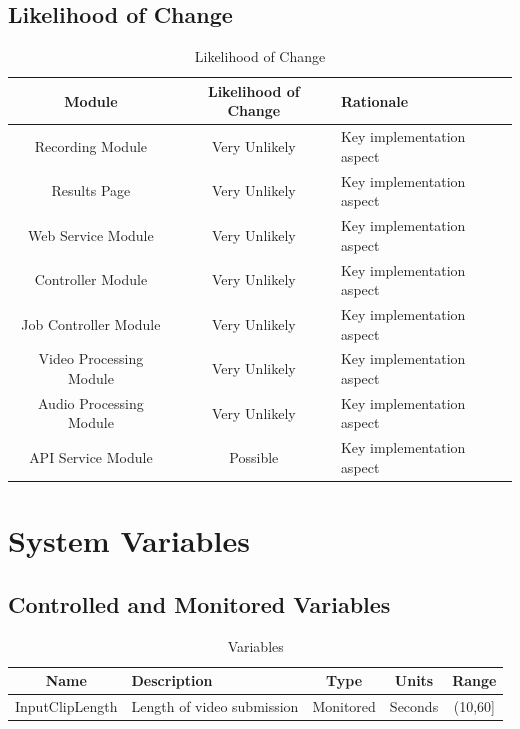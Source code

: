 \documentclass{article}
\begin{document}
\subsection{Likelihood of Change}
\begin{table}[H]
    \caption{Likelihood of Change}
    \centering
    \begin{tabularx}{\textwidth}{|c|c|X|} \hline
        \textbf{Module} & \textbf{Likelihood of Change} & \textbf{Rationale} \\ \hline
         Recording Module & Very Unlikely & Key implementation aspect \\ \hline
         Results Page & Very Unlikely & Key implementation aspect \\ \hline
         Web Service Module & Very Unlikely & Key implementation aspect \\ \hline
         Controller Module & Very Unlikely & Key implementation aspect \\ \hline
         Job Controller Module & Very Unlikely & Key implementation aspect \\ \hline
         Video Processing Module & Very Unlikely & Key implementation aspect \\ \hline
         Audio Processing Module & Very Unlikely & Key implementation aspect \\ \hline
         API Service Module & Possible & Key implementation aspect \\ \hline
    \end{tabularx}
    \label{tab:likelihood of change}
\end{table}

\section{System Variables}

\subsection{Controlled and Monitored Variables}

\begin{table}[H]
    \caption{Variables}
    \centering
    \begin{tabularx}{\textwidth}{|c|X|c|c|c|}
        \hline
        \textbf{Name} & \textbf{Description} & \textbf{Type} & \textbf{Units} & \textbf{Range}\\
        \hline
        InputClipLength & Length of video submission & Monitored & Seconds & (10,60] \\
        \hline
    \end{tabularx}
    \label{tab:Variables}
\end{table}
\end{document}
